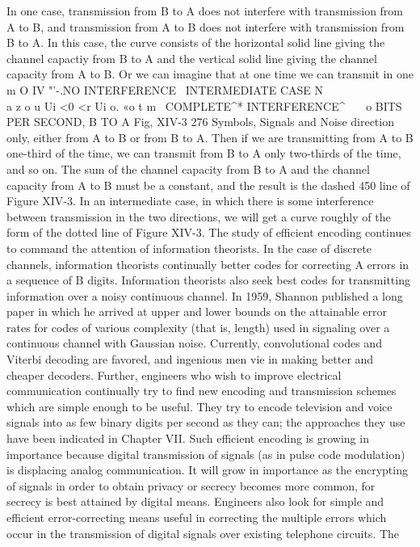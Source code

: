 {{{{{{{{{{{{In one case, transmission from B to A does not interfere with
transmission from A to B, and transmission from A to B does not
interfere with transmission from B to A. In this case, the curve
consists of the horizontal solid line giving the channel capactiy
from B to A and the vertical solid line giving the channel capacity
from A to B.
Or we can imagine that at one time we can transmit in one
m
O
IV "'-.NO INTERFERENCE
\
INTERMEDIATE
CASE
N\ \
\ \\
a
z
o
u Ui <0
<r Ui
o.
«o
t
m
\
COMPLETE^*
INTERFERENCE^
\ \ \
o
BITS PER SECOND, B TO A
Fig, XIV-3
276
Symbols, Signals and Noise
direction only, either from A to B or from B to A. Then if we are
transmitting from A to B one-third of the time, we can transmit
from B to A only two-thirds of the time, and so on. The sum of the
channel capacity from B to A and the channel capacity from A to B
must be a constant, and the result is the dashed 450 line of Figure
XIV-3.
In an intermediate case, in which there is some interference between
transmission in the two directions, we will get a curve
roughly of the form of the dotted line of Figure XIV-3.
The study of efficient encoding continues to command the attention
of information theorists. In the case of discrete channels, information
theorists continually better codes for correcting A errors
in a sequence of B digits.
Information theorists also seek best codes for transmitting information
over a noisy continuous channel. In 1959, Shannon
published a long paper in which he arrived at upper and lower
bounds on the attainable error rates for codes of various complexity
(that is, length) used in signaling over a continuous channel
with Gaussian noise. Currently, convolutional codes and Viterbi
decoding are favored, and ingenious men vie in making better and
cheaper decoders.
Further, engineers who wish to improve electrical communication
continually try to find new encoding and transmission schemes
which are simple enough to be useful. They try to encode television
and voice signals into as few binary digits per second as they can;
the approaches they use have been indicated in Chapter VII. Such
efficient encoding is growing in importance because digital transmission
of signals (as in pulse code modulation) is displacing
analog communication. It will grow in importance as the encrypting
of signals in order to obtain privacy or secrecy becomes more
common, for secrecy is best attained by digital means.
Engineers also look for simple and efficient error-correcting
means useful in correcting the multiple errors which occur in the
transmission of digital signals over existing telephone circuits. The
}}}}}}}}}}}}
